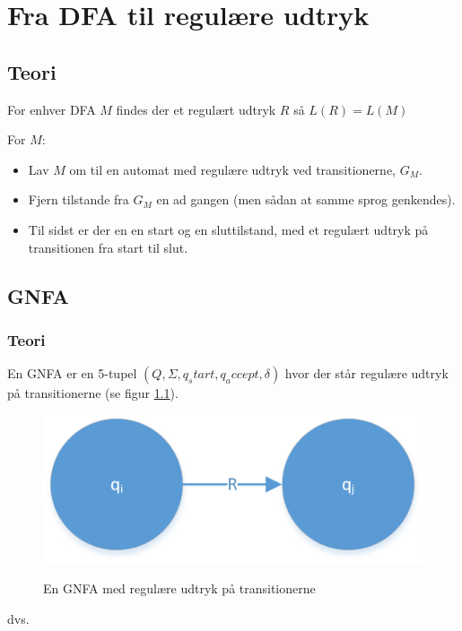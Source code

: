 \documentclass[a4paper,10pt,article]{memoir}
\begin{document}
\chapter{Fra DFA til regulære udtryk}
\section{Teori}
\begin{saetning}For enhver DFA $M$ findes der et regulært udtryk $R$ så $L(R)=L(M)$\end{saetning}
\begin{bevis}
For $M$:
\begin{itemize}
\item Lav $M$ om til en automat med regulære udtryk ved transitionerne, $G_M$.
\item Fjern tilstande fra $G_M$ en ad gangen (men sådan at samme sprog genkendes).
\item Til sidst er der en en start og en sluttilstand, med et regulært udtryk på transitionen fra start til slut.
\end{itemize}

\end{bevis}
\section{GNFA}
\subsection{Teori}
\begin{definition}
En GNFA er en 5-tupel $(Q, \Sigma, q_start, q_accept, \delta)$ hvor der står regulære udtryk på transitionerne (se figur \ref{fig:fig16}).
\end{definition}
\begin{figure}[h]%
\centering
\includegraphics[width=\textwidth]{Fig16x.png}
\label{fig:fig16}
\caption{En GNFA med regulære udtryk på transitionerne}
\end{figure}
dvs.
\end{document}
